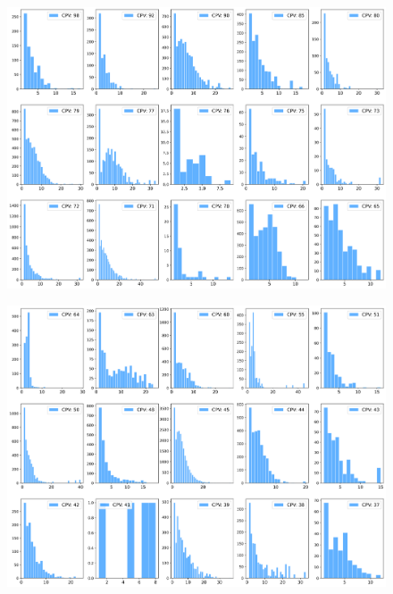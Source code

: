 \begin{figure}[H]
	\centering
	\includegraphics[width=\textwidth]{imagens/r019_hist1.png}
\end{figure}

\begin{figure}[H]
	\centering
	\includegraphics[width=\textwidth]{imagens/r019_hist2.png}
\end{figure}

